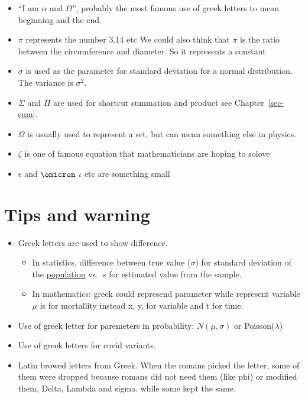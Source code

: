 \documentclass[
  letterpaper,
  DIV=11,
  numbers=noendperiod]{scrreprt}
\providecommand{\tightlist}{%
  \setlength{\itemsep}{0pt}\setlength{\parskip}{0pt}}
\begin{document}
\begin{itemize}
\tightlist
\item
  ``I am \(\alpha\) and \(\Omega\)'', probably the most famous use of
  greek letters to mean beginning and the end.
\item
  \(\pi\) represents the number 3.14 etc We could also think that
  \(\pi\) is the ratio between the circumference and diameter. So it
  represents a constant
\item
  \(\sigma\) is used as the parameter for standard deviation for a
  normal distribution. The variance is \(\sigma^2\).
\item
  \(\Sigma\) and \(\Pi\) are used for shortcut summation and product see
  Chapter~\ref{sec-sum}.
\item
  \(\Omega\) is usually used to represent a set, but can mean something
  else in physics.
\item
  \(\zeta\) is one of famous equation that mathematicians are hoping to
  solove
\item
  \(\epsilon\) and \(\omicron\) \(\iota\) etc are something small
\end{itemize}

\section*{Tips and warning}\label{tips-and-warning-1}


\begin{itemize}
\tightlist
\item
  Greek letters are used to show difference.

  \begin{itemize}
  \tightlist
  \item
    In statistics, difference between true value (\(\sigma\)) for
    standard deviation of the \href{@sec-population}{population}
    vs.~\(s\) for estimated value from the sample.
  \item
    In mathematics: greek could represend parameter while represent
    variable \(\mu\) is for mortallity instead x, y, for variable and t
    for time.
  \end{itemize}
\item
  Use of greek letter for paremeters in probability: \(N(\mu, \sigma)\)
  or Poisson(\(\lambda\))
\item
  Use of greek letters for covid variants.
\item
  Latin browed letters from Greek. When the romans picked the letter,
  some of them were dropped because romans did not need them (like phi)
  or modified them, Delta, Lambda and sigma. while some kept the same.
\end{itemize}
\end{document}
